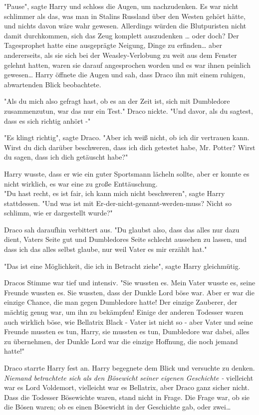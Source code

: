 {"Pause", sagte Harry und schloss die Augen, um nachzudenken. Es war nicht schlimmer als das, was man in Stalins Russland über den Westen gehört hätte, und nichts davon wäre wahr gewesen. Allerdings würden die Blutpuristen nicht damit durchkommen, sich das Zeug komplett auszudenken … oder doch? Der Tagesprophet hatte eine ausgeprägte Neigung, Dinge zu erfinden… aber andererseits, als sie sich bei der Weasley-Verlobung zu weit aus dem Fenster gelehnt hatten, waren sie darauf angesprochen worden und es war ihnen peinlich gewesen… Harry öffnete die Augen und sah, dass Draco ihn mit einem ruhigen, abwartenden Blick beobachtete.

"Als du mich also gefragt hast, ob es an der Zeit ist, sich mit Dumbledore zusammenzutun, war das nur ein Test." Draco nickte. "Und davor, als du sagtest, dass es sich richtig anhört -"

"Es klingt richtig", sagte Draco. "Aber ich weiß nicht, ob ich dir vertrauen kann. Wirst du dich darüber beschweren, dass ich dich getestet habe, Mr. Potter? Wirst du sagen, dass ich dich getäuscht habe?"

Harry wusste, dass er wie ein guter Sportsmann lächeln sollte, aber er konnte es nicht wirklich, es war eine zu große Enttäuschung.\\ "Du hast recht, es ist fair, ich kann mich nicht beschweren", sagte Harry stattdessen. "Und was ist mit Er-der-nicht-genannt-werden-muss? Nicht so schlimm, wie er dargestellt wurde?"

Draco sah daraufhin verbittert aus. "Du glaubst also, dass das alles nur dazu dient, Vaters Seite gut und Dumbledores Seite schlecht aussehen zu lassen, und dass ich das alles selbst glaube, nur weil Vater es mir erzählt hat."

"Das ist eine Möglichkeit, die ich in Betracht ziehe", sagte Harry gleichmütig.

Dracos Stimme war tief und intensiv. "Sie wussten es. Mein Vater wusste es, seine Freunde wussten es. Sie wussten, dass der Dunkle Lord böse war. Aber er war die einzige Chance, die man gegen Dumbledore hatte! Der einzige Zauberer, der mächtig genug war, um ihn zu bekämpfen! Einige der anderen Todesser waren auch wirklich böse, wie Bellatrix Black - Vater ist nicht so - aber Vater und seine Freunde mussten es tun, Harry, sie mussten es tun, Dumbledore war dabei, alles zu übernehmen, der Dunkle Lord war die einzige Hoffnung, die noch jemand hatte!"

Draco starrte Harry fest an. Harry begegnete dem Blick und versuchte zu denken. \emph{Niemand betrachtete sich als den Bösewicht seiner eigenen Geschichte -} vielleicht war es Lord Voldemort, vielleicht war es Bellatrix, aber Draco ganz sicher nicht. Dass die Todesser Bösewichte waren, stand nicht in Frage. Die Frage war, ob sie die Bösen waren; ob es einen Bösewicht in der Geschichte gab, oder zwei…

}

